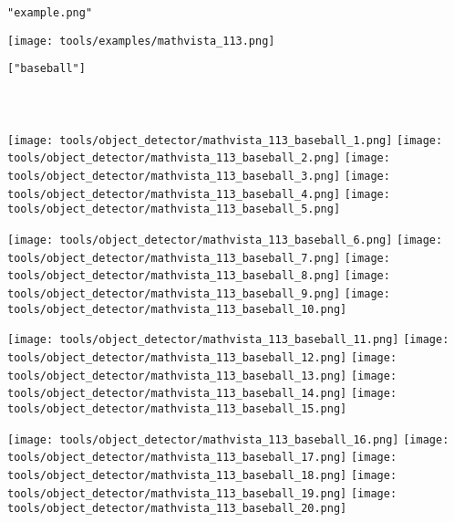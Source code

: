 \begin{textcolorbox}
 \texttt{"example.png"}

\vspace{0.2cm}
\texttt{[image: tools/examples/mathvista\_113.png]}
\vspace{0.2cm}

 \texttt{["baseball"]}
\\\\
\\\\
\texttt{[image: tools/object\_detector/mathvista\_113\_baseball\_1.png]}
\texttt{[image: tools/object\_detector/mathvista\_113\_baseball\_2.png]}
\texttt{[image: tools/object\_detector/mathvista\_113\_baseball\_3.png]}
\texttt{[image: tools/object\_detector/mathvista\_113\_baseball\_4.png]}
\texttt{[image: tools/object\_detector/mathvista\_113\_baseball\_5.png]}

\texttt{[image: tools/object\_detector/mathvista\_113\_baseball\_6.png]}
\texttt{[image: tools/object\_detector/mathvista\_113\_baseball\_7.png]}
\texttt{[image: tools/object\_detector/mathvista\_113\_baseball\_8.png]}
\texttt{[image: tools/object\_detector/mathvista\_113\_baseball\_9.png]}
\texttt{[image: tools/object\_detector/mathvista\_113\_baseball\_10.png]}

\texttt{[image: tools/object\_detector/mathvista\_113\_baseball\_11.png]}
\texttt{[image: tools/object\_detector/mathvista\_113\_baseball\_12.png]}
\texttt{[image: tools/object\_detector/mathvista\_113\_baseball\_13.png]}
\texttt{[image: tools/object\_detector/mathvista\_113\_baseball\_14.png]}
\texttt{[image: tools/object\_detector/mathvista\_113\_baseball\_15.png]}

\texttt{[image: tools/object\_detector/mathvista\_113\_baseball\_16.png]}
\texttt{[image: tools/object\_detector/mathvista\_113\_baseball\_17.png]}
\texttt{[image: tools/object\_detector/mathvista\_113\_baseball\_18.png]}
\texttt{[image: tools/object\_detector/mathvista\_113\_baseball\_19.png]}
\texttt{[image: tools/object\_detector/mathvista\_113\_baseball\_20.png]}
    

\end{textcolorbox}
